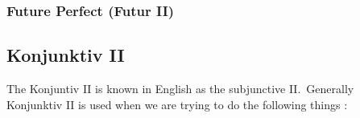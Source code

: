 \documentclass[a4paper,twocolumn,10pt]{article}
\newcommand{\newpar}
{\par \vspace{0.3cm}}
\newcommand{\subsectionend}
{
\nolinenumbers
\linenumbers
}
\newcommand{\subsubsectionend}
{
\nolinenumbers
\linenumbers
}
\begin{document}



\subsubsectionend

\subsubsection{Future Perfect (Futur II)}
\label{sssec:future_ii}



\subsubsectionend

\subsectionend

\subsection{Konjunktiv II}
\label{ssec:konjunktiv_ii}

The Konjuntiv II is known in English as the subjunctive II.\ Generally
Konjunktiv II is used when we are trying to do the following things :\newpar


\end{document}
